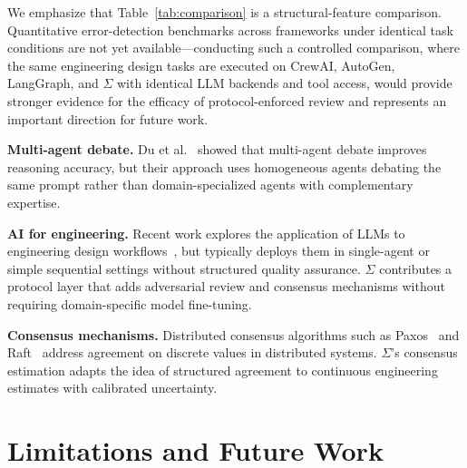 \documentclass[11pt,a4paper]{article}
\begin{document}
We emphasize that Table~\ref{tab:comparison} is a structural-feature comparison. Quantitative error-detection benchmarks across frameworks under identical task conditions are not yet available---conducting such a controlled comparison, where the same engineering design tasks are executed on CrewAI, AutoGen, LangGraph, and $\Sigma$ with identical LLM backends and tool access, would provide stronger evidence for the efficacy of protocol-enforced review and represents an important direction for future work.

\textbf{Multi-agent debate.} Du et al.~\cite{du2023debate} showed that multi-agent debate improves reasoning accuracy, but their approach uses homogeneous agents debating the same prompt rather than domain-specialized agents with complementary expertise.

\textbf{AI for engineering.} Recent work explores the application of LLMs to engineering design workflows~\cite{llm4engineering}, but typically deploys them in single-agent or simple sequential settings without structured quality assurance. $\Sigma$ contributes a protocol layer that adds adversarial review and consensus mechanisms without requiring domain-specific model fine-tuning.

\textbf{Consensus mechanisms.} Distributed consensus algorithms such as Paxos~\cite{lamport1998} and Raft~\cite{ongaro2014} address agreement on discrete values in distributed systems. $\Sigma$'s consensus estimation adapts the idea of structured agreement to continuous engineering estimates with calibrated uncertainty.

\section{Limitations and Future Work}
\end{document}
